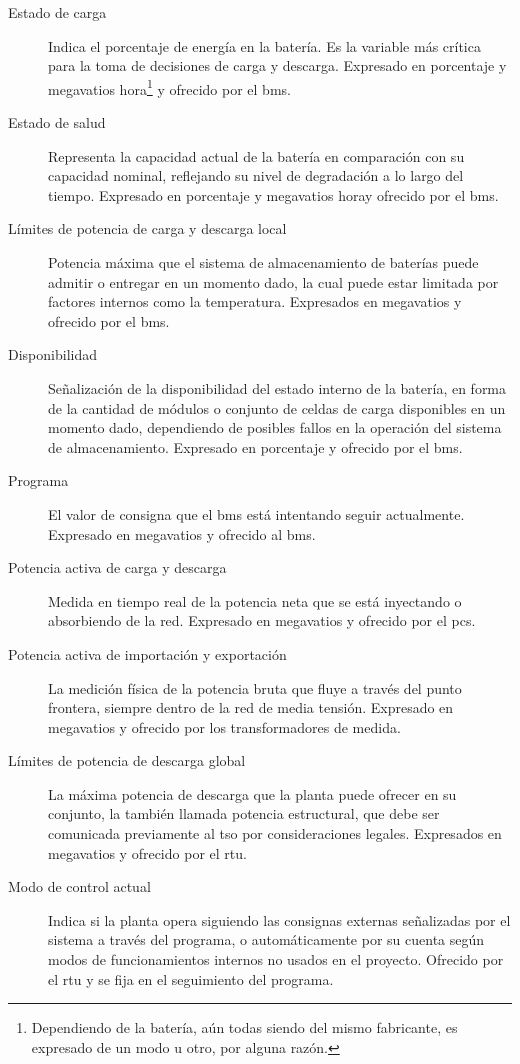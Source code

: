 \begin{description}

  \item[Estado de carga] Indica el porcentaje de energía en la batería. Es la variable más crítica para la toma de decisiones de carga y descarga. Expresado en porcentaje y megavatios hora\footnote{Dependiendo de la batería, aún todas siendo del mismo fabricante, es expresado de un modo u otro, por alguna razón.} y ofrecido por el \gls{bms}.

  \item[Estado de salud] Representa la capacidad actual de la batería en comparación con su capacidad nominal, reflejando su nivel de degradación a lo largo del tiempo. Expresado en porcentaje y megavatios hora\footnotemark[\value{footnote}] y ofrecido por el \gls{bms}.

  \item[Límites de potencia de carga y descarga local] Potencia máxima que el sistema de almacenamiento de baterías puede admitir o entregar en un momento dado, la cual puede estar limitada por factores internos como la temperatura. Expresados en megavatios y ofrecido por el \gls{bms}.

  \item[Disponibilidad] Señalización de la disponibilidad del estado interno de la batería, en forma de la cantidad de módulos o conjunto de celdas de carga disponibles en un momento dado, dependiendo de posibles fallos en la operación del sistema de almacenamiento. Expresado en porcentaje y ofrecido por el \gls{bms}.

  \item[Programa] El valor de consigna que el \gls{bms} está intentando seguir actualmente. Expresado en megavatios y ofrecido al \gls{bms}.

  \item[Potencia activa de carga y descarga] Medida en tiempo real de la potencia neta que se está inyectando o absorbiendo de la red. Expresado en megavatios y ofrecido por el \gls{pcs}.

  \item[Potencia activa de importación y exportación] La medición física de la potencia bruta que fluye a través del punto frontera, siempre dentro de la red de media tensión. Expresado en megavatios y ofrecido por los transformadores de medida.

  \item[Límites de potencia de descarga global] La máxima potencia de descarga que la planta puede ofrecer en su conjunto, la también llamada potencia estructural, que debe ser comunicada previamente al \gls{tso} por consideraciones legales. Expresados en megavatios y ofrecido por el \gls{rtu}.

  \item[Modo de control actual] Indica si la planta opera siguiendo las consignas externas señalizadas por el sistema a través del programa, o automáticamente por su cuenta según modos de funcionamientos internos no usados en el proyecto. Ofrecido por el \gls{rtu} y se fija en el seguimiento del programa.

\end{description}

